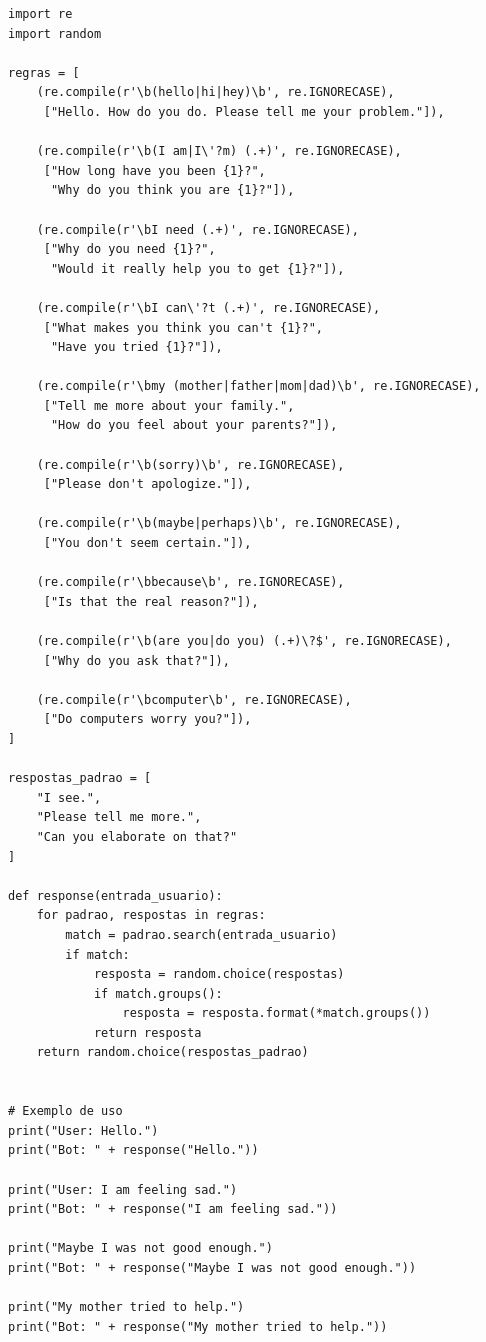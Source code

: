 \documentclass[a4paper,oneside]{book}
\begin{document}
\begin{verbatim}
import re  
import random  

regras = [
    (re.compile(r'\b(hello|hi|hey)\b', re.IGNORECASE),
     ["Hello. How do you do. Please tell me your problem."]),

    (re.compile(r'\b(I am|I\'?m) (.+)', re.IGNORECASE),
     ["How long have you been {1}?",   
      "Why do you think you are {1}?"]),

    (re.compile(r'\bI need (.+)', re.IGNORECASE),
     ["Why do you need {1}?",
      "Would it really help you to get {1}?"]),

    (re.compile(r'\bI can\'?t (.+)', re.IGNORECASE),
     ["What makes you think you can't {1}?",
      "Have you tried {1}?"]),

    (re.compile(r'\bmy (mother|father|mom|dad)\b', re.IGNORECASE),
     ["Tell me more about your family.",
      "How do you feel about your parents?"]),

    (re.compile(r'\b(sorry)\b', re.IGNORECASE),
     ["Please don't apologize."]),

    (re.compile(r'\b(maybe|perhaps)\b', re.IGNORECASE),
     ["You don't seem certain."]),

    (re.compile(r'\bbecause\b', re.IGNORECASE),
     ["Is that the real reason?"]),

    (re.compile(r'\b(are you|do you) (.+)\?$', re.IGNORECASE),
     ["Why do you ask that?"]),

    (re.compile(r'\bcomputer\b', re.IGNORECASE),
     ["Do computers worry you?"]),
]

respostas_padrao = [
    "I see.",  
    "Please tell me more.",  
    "Can you elaborate on that?"  
]

def response(entrada_usuario):
    for padrao, respostas in regras:
        match = padrao.search(entrada_usuario)  
        if match:
            resposta = random.choice(respostas)
            if match.groups():
                resposta = resposta.format(*match.groups())
            return resposta
    return random.choice(respostas_padrao)


# Exemplo de uso
print("User: Hello.")
print("Bot: " + response("Hello."))

print("User: I am feeling sad.")
print("Bot: " + response("I am feeling sad."))

print("Maybe I was not good enough.")
print("Bot: " + response("Maybe I was not good enough."))

print("My mother tried to help.")
print("Bot: " + response("My mother tried to help."))

\end{verbatim}
\end{document}
